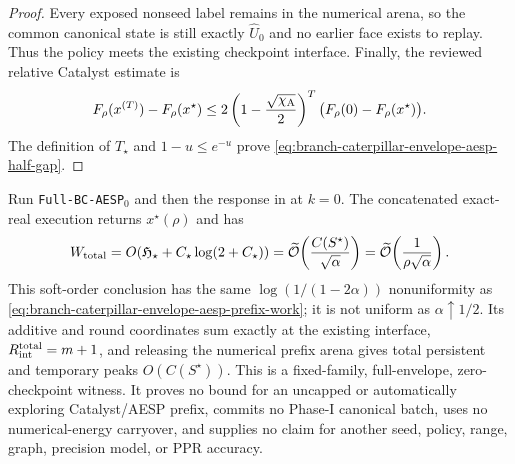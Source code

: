 \begin{proof}
Every exposed nonseed label remains in the numerical arena, so the common
canonical state is still exactly $\widehat U_0$ and no earlier face exists to
replay.  Thus the policy meets the existing checkpoint interface.  Finally,
the reviewed relative Catalyst estimate is
\[
 F_\rho(x^{(T)})-F_\rho(x^\star)
 \leq2\left(1-\frac{\sqrt{\chi_{\rm A}}}{2}\right)^T
       \bigl(F_\rho(0)-F_\rho(x^\star)\bigr).
\]
The definition of $T_\star$ and $1-u\leq e^{-u}$ prove
\cref{eq:branch-caterpillar-envelope-aesp-half-gap}.
\end{proof}

\begin{corollary}
\label{cor:branch-caterpillar-envelope-aesp-product}
Run \texttt{Full-BC-AESP}$_0$ and then the response in
 at $k=0$.  The
concatenated exact-real execution returns $x^\star(\rho)$ and has
\begin{equation}
 W_{\rm total}
 =O\!\left(\mathfrak H_\star
      +C_\star\log(2+C_\star)\right)
 =\widetilde{\mathcal{O}}\!\left(\frac{C(S^\star)}{\sqrt\alpha}\right)
 =\widetilde{\mathcal{O}}\!\left(\frac1{\rho\sqrt\alpha}\right).
 \label{eq:branch-caterpillar-envelope-aesp-total-work}
\end{equation}
This soft-order conclusion has the same
$\log(1/(1-2\alpha))$ nonuniformity as
\cref{eq:branch-caterpillar-envelope-aesp-prefix-work}; it is not uniform as
$\alpha\uparrow1/2$.
Its additive and round coordinates sum exactly at the existing interface,
$R_{\rm int}^{\rm total}=m+1$, and releasing the numerical prefix arena gives
total persistent and temporary peaks $O(C(S^\star))$.  This is a
fixed-family, full-envelope, zero-checkpoint witness.  It proves no bound for
an uncapped or automatically exploring Catalyst/AESP prefix, commits no
Phase-I canonical batch, uses no numerical-energy carryover, and supplies no
claim for another seed, policy, range, graph, precision model, or PPR
accuracy.
\end{corollary}
